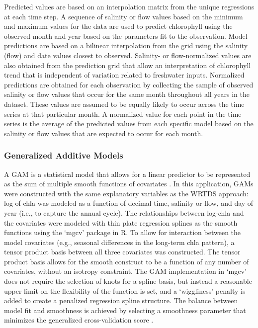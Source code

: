 \documentclass[letterpaper,12pt,oneside]{article}\usepackage[]{graphicx}\usepackage[]{color}
\begin{document}
Predicted values are based on an interpolation matrix from the unique regressions at each time step. A sequence of salinity or flow values based on the minimum and maximum values for the data are used to predict chlorophyll using the observed month and year based on the parameters fit to the observation. Model predictions are based on a bilinear interpolation from the grid using the salinity (flow) and date values closest to observed. Salinity- or flow-normalized values are also obtained from the prediction grid that allow an interpretation of chlorophyll trend that is independent of variation related to freshwater inputs. Normalized predictions are obtained for each observation by collecting the sample of observed salinity or flow values that occur for the same month throughout all years in the dataset.  These values are assumed to be equally likely to occur across the time series at that particular month. A normalized value for each point in the time series is the average of the predicted values from each specific model based on the salinity or flow values that are expected to occur for each month.

\subsubsection{Generalized Additive Models}

A \ac{GAM} is a statistical model that allows for a linear predictor to be represented as the sum of multiple smooth functions of covariates \citep{Hastie90}. In this application, \acp{GAM} were constructed with the same explanatory variables as the \ac{WRTDS} approach: log of \ac{chla} was modeled as a function of decimal time, salinity or flow, and day of year (i.e., to capture the annual cycle). The relationships between log-\ac{chla} and the covariates were modeled with thin plate regression splines \citep{Wood06} as the smooth functions using the `mgcv' package in R. To allow for interaction between the model covariates (e.g., seasonal differences in the long-term \ac{chla} pattern), a tensor product basis between all three covariates was constructed. The tensor product basis allows for the smooth construct to be a function of any number of covariates, without an isotropy constraint. The \ac{GAM} implementation in `mgcv' does not require the selection of knots for a spline basis, but instead a reasonable upper limit on the flexibility of the function is set, and a `wiggliness' penalty is added to create a penalized regression spline structure. The balance between model fit and smoothness is achieved by selecting a smoothness parameter that minimizes the generalized cross-validation score \citep{Wood06}.
\end{document}
